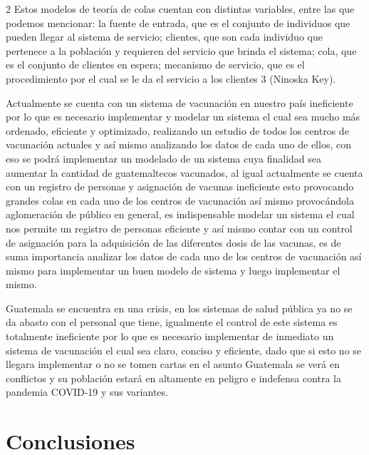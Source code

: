\documentclass[12pt,spanish,Letterpaper,openany]{book}
\begin{document}
\begin {multicols}{2}
Estos modelos de teoría de colas cuentan con distintas variables, entre las que podemos
mencionar: la fuente de entrada, que es el conjunto de individuos que pueden llegar al sistema
de servicio; clientes, que son cada individuo que pertenece a la población y requieren del
servicio que brinda el sistema; cola, que es el conjunto de clientes en espera; mecanismo de
servicio, que es el procedimiento por el cual se le da el servicio a los clientes 3
(Ninoska Key).

Actualmente se cuenta con un sistema de vacunación en nuestro país ineficiente por lo que es
necesario implementar y modelar un sistema el cual sea mucho más ordenado, eficiente y
optimizado, realizando un estudio de todos los centros de vacunación actuales y así mismo
analizando los datos de cada uno de ellos, con eso se podrá implementar un modelado de un
sistema cuya finalidad sea aumentar la cantidad de guatemaltecos vacunados, al igual
actualmente se cuenta con un registro de personas y asignación de vacunas ineficiente esto
provocando grandes colas en cada uno de los centros de vacunación así mismo provocándola
aglomeración de público en general, es indispensable modelar un sistema el cual nos permite
un registro de personas eficiente y así mismo contar con un control de asignación para la
adquisición de las diferentes dosis de las vacunas, es de suma importancia analizar los datos
de cada uno de los centros de vacunación así mismo para implementar un buen modelo de
sistema y luego implementar el mismo.

Guatemala se encuentra en una crisis, en los sistemas de salud pública ya no se da abasto con
el personal que tiene, igualmente el control de este sistema es totalmente ineficiente por lo
que es necesario implementar de inmediato un sistema de vacunación el cual sea claro,
conciso y eficiente, dado que si esto no se llegara implementar o no se tomen cartas en el
asunto Guatemala se verá en conflictos y su población estará en altamente en peligro e
indefensa contra la pandemia COVID-19 y sus variantes.

\hypertarget{conclusiones-8}{%
\section{Conclusiones}\label{conclusiones-8}}


\end{multicols}
\end{document}
